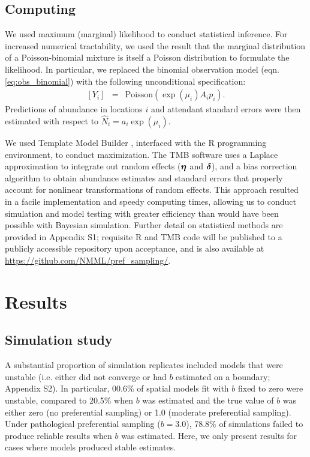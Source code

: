 \documentclass[times,mee,doublespace,]{besauth2}
\begin{document}
\subsection{Computing}

We used maximum (marginal) likelihood to conduct statistical inference. For increased numerical tractability, we used the result that the marginal distribution of a Poisson-binomial mixture is itself a Poisson distribution to formulate the likelihood.  In particular, we replaced the binomial observation model (eqn. \ref{eq:obs_binomial}) with the following unconditional specification:
\begin{eqnarray}
\label{eq:obs_pois}
   [Y_i] & = & \text{Poisson}(\exp(\mu_i) A_i p_i).
\end{eqnarray}
Predictions of abundance in locations $i$ and attendant standard errors were then estimated with respect to $\hat{N}_i = a_i \exp(\mu_i)$.

We used Template Model Builder \citep[TMB; ][]{KristensenEtAl2016}, interfaced with the R programming environment, to conduct maximization. The TMB software uses a Laplace approximation to integrate out random effects ($\boldsymbol{\eta}$ and $\boldsymbol{\delta}$), and a bias correction algorithm \citep{TierneyEtAl1989,ThorsonKristensen2016} to obtain abundance estimates and standard errors that properly account for nonlinear transformations of random effects.  This approach resulted in a facile implementation and speedy computing times, allowing us to conduct simulation and model testing with greater efficiency than would have been possible with Bayesian simulation.  Further detail on statistical methods are provided in Appendix S1; requisite R and TMB code will be published to a publicly accessible repository upon acceptance, and is also available at \url{https://github.com/NMML/pref_sampling/}.

\section{Results}

\subsection{Simulation study}

A substantial proportion of simulation replicates included models that were unstable (i.e. either did not converge or had $b$ estimated on a boundary; Appendix S2).  In particular, 00.6\% of spatial models fit with $b$ fixed to zero were unstable, compared to  20.5\% when $b$ was estimated and the true value of $b$ was either zero (no preferential sampling) or 1.0 (moderate preferential sampling).  Under pathological preferential sampling ($b=3.0$), 78.8\% of simulations failed to produce reliable results when $b$ was estimated.  Here, we only present results for cases where models produced stable estimates.
\end{document}
